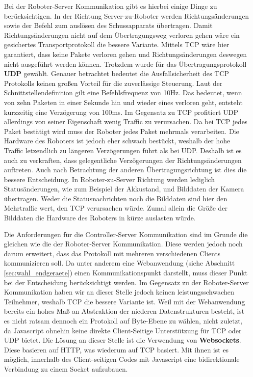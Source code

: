 Bei der Roboter-Server Kommunikation gibt es hierbei einige Dinge zu berücksichtigen. In der Richtung Server-zu-Roboter werden Richtungsänderungen sowie der Befehl zum auslösen des Schussapparats übertragen. Damit Richtungsänderungen nicht auf dem Übertragungsweg verloren gehen wäre ein gesichertes Transportprotokoll die bessere Variante. Mittels TCP wäre hier garantiert, dass keine Pakete verloren gehen und Richtungsänderungen deswegen nicht ausgeführt werden können. Trotzdem wurde für das Übertragungsprotokoll \textbf{UDP} gewählt. Genauer betrachtet bedeutet die Ausfallsicherheit des TCP Protokolls keinen großen Vorteil für die zuverlässige Steuerung. Laut der Schnittstellendefinition gilt eine Befehlsfrequenz von 10Hz. Das bedeutet, wenn von zehn Paketen in einer Sekunde hin und wieder eines verloren geht, entsteht kurzzeitig eine Verzögerung von 100ms. Im Gegensatz zu TCP profitiert UDP allerdings von seiner Eigenschaft wenig Traffic zu verursachen. Da bei TCP jedes Paket bestätigt wird muss der Roboter jedes Paket mehrmals verarbeiten. Die Hardware des Roboters ist jedoch eher schwach bestückt, weshalb der hohe Traffic letzendlich zu längeren Verzögerungen führt als bei UDP. Deshalb ist es auch zu verkraften, dass gelegentliche Verzögerungen der Richtungsänderungen auftreten. Auch nach Betrachtung der anderen Übertragungsrichtung ist dies die bessere Entscheidung. In Roboter-zu-Server Richtung werden lediglich Statusänderungen, wie zum Beispiel der Akkustand, und Bilddaten der Kamera übertragen. Weder die Statusnachrichten noch die Bilddaten sind hier den Mehrtraffic wert, den TCP verursachen würde. Zumal allein die Größe der Bilddaten die Hardware des Roboters in kürze auslasten würde.


Die Anforderungen für die Controller-Server Kommunikation sind im Grunde die gleichen wie die der Roboter-Server Kommunikation. Diese werden jedoch noch darum erweitert, dass das Protokoll mit mehreren verschiedenen Clients kommunizieren soll. Da unter anderem eine Webanwendung (siehe Abschnitt \ref{sec:wahl_endgeraete}) einen Kommunikationspunkt darstellt, muss dieser Punkt bei der Entscheidung berücksichtigt werden. Im Gegensatz zu der Roboter-Server Kommunikation haben wir an dieser Stelle jedoch keinen leistungsschwachen Teilnehmer, weshalb TCP die bessere Variante ist. Weil mit der Webanwendung bereits ein hohes Maß an Abstraktion der niederen Datenstrukturen besteht, ist es nicht ratsam dennoch ein Protokoll auf Byte-Ebene zu wählen, nicht zuletzt, da Javascript ohnehin keine direkte Client-Seitige Unterstützung für TCP oder UDP bietet. Die Lösung an dieser Stelle ist die Verwendung von \textbf{Websockets}. Diese basieren auf HTTP, was wiederum auf TCP basiert. Mit ihnen ist es möglich, innerhalb des Client-seitigen Codes mit Javascript eine bidirektionale Verbindung zu einem Socket aufzubauen.  